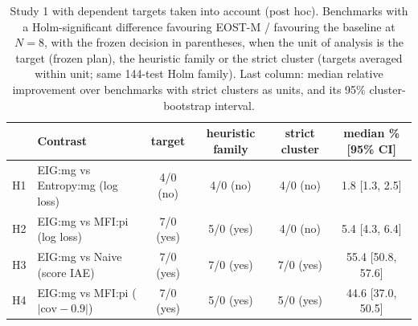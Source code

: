 \begin{table}[tbp]
\centering\footnotesize
\caption{Study 1 with dependent targets taken into account (post hoc). Benchmarks with a Holm-significant difference favouring EOST-M / favouring the baseline at $N=8$, with the frozen decision in parentheses, when the unit of analysis is the target (frozen plan), the heuristic family or the strict cluster (targets averaged within unit; same 144-test Holm family). Last column: median relative improvement over benchmarks with strict clusters as units, and its 95\% cluster-bootstrap interval.}
\label{tab:clusters}
\setlength{\tabcolsep}{3.5pt}
\begin{tabular}{@{}llcccc@{}}
\toprule
 & Contrast & target & heuristic family & strict cluster & median \% [95\% CI] \\
\midrule
H1 & EIG:mg vs Entropy:mg (log loss) & 4/0 (no) & 4/0 (no) & 4/0 (no) & 1.8 [1.3, 2.5] \\
H2 & EIG:mg vs MFI:pi (log loss) & 7/0 (yes) & 5/0 (yes) & 4/0 (no) & 5.4 [4.3, 6.4] \\
H3 & EIG:mg vs Naive (score IAE) & 7/0 (yes) & 7/0 (yes) & 7/0 (yes) & 55.4 [50.8, 57.6] \\
H4 & EIG:mg vs MFI:pi ($|\mathrm{cov}-0.9|$) & 7/0 (yes) & 5/0 (yes) & 5/0 (yes) & 44.6 [37.0, 50.5] \\
\bottomrule
\end{tabular}
\end{table}
